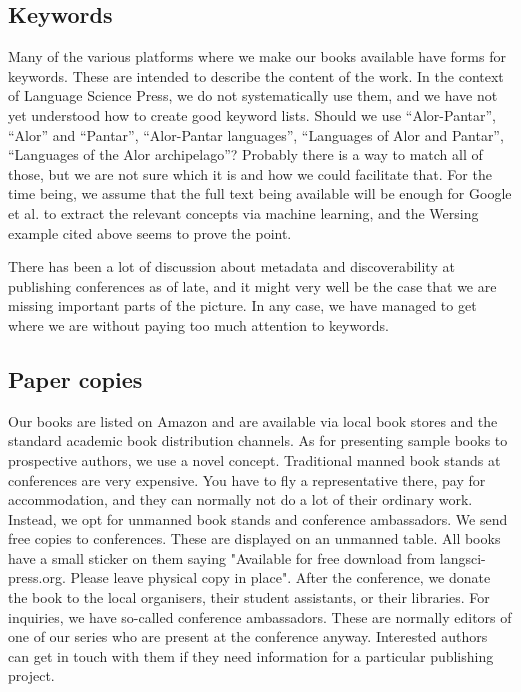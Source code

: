 \documentclass[nonflat,modfonts,output=book] {langsci/langscibook}
\begin{document}
\subsection{Keywords }
Many of the various platforms where we make our books available have forms for keywords. These are intended to describe the content of the work. In the context of Language Science Press, we do not systematically use them, and we have not yet understood how to create good keyword lists. Should we use ``Alor-Pantar'', ``Alor'' and ``Pantar'', ``Alor-Pantar languages'', ``Languages of Alor and Pantar'', ``Languages of the Alor archipelago''? Probably there is a way to match all of those, but we are not sure which it is and how we could facilitate that. For the time being, we assume that the full text being available will be enough for Google et al. to extract the relevant concepts via machine learning, and the Wersing example cited above seems to prove the point. 

There has been a lot of discussion about metadata and discoverability at publishing conferences as of late, and it might very well be the case that we are missing important parts of the picture. In any case, we have managed to get where we are without paying too much attention to keywords. 
                    
\subsection{Paper copies}                    
Our books are listed on Amazon and are available via local book stores and the standard academic book distribution channels. As for presenting sample books to prospective authors, we use a novel concept. Traditional manned book stands at conferences are very expensive. You have to fly a representative there, pay for accommodation, and they can normally not do a lot of their ordinary work. Instead, we opt for unmanned book stands and conference ambassadors. We send free copies to conferences.  These are displayed on an unmanned table. All books have a small sticker on them saying "Available for free download from langsci-press.org. Please leave physical copy in place". After the conference, we donate the book to the local organisers, their student assistants, or their libraries. 
For inquiries, we have so-called conference ambassadors. These are normally editors of one of our series who are present at the conference anyway. Interested authors can get in touch with them if they need information for a particular publishing project. 
                    
\end{document}
